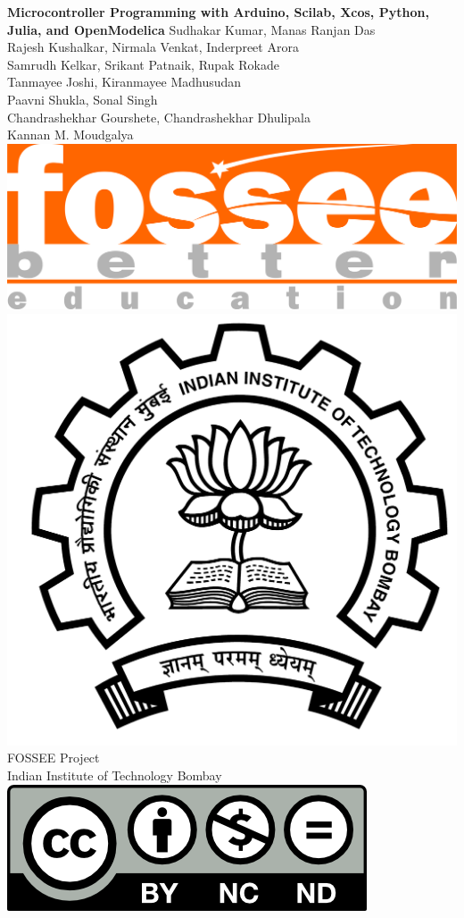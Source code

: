 \begin{center}
    {\bf {\Huge Microcontroller Programming with Arduino, Scilab, Xcos,
            Python, Julia, and OpenModelica}}
    \vfill
    Sudhakar Kumar, Manas Ranjan Das \\
    Rajesh Kushalkar, Nirmala Venkat, Inderpreet Arora \\
    Samrudh Kelkar, Srikant Patnaik, Rupak Rokade \\
    Tanmayee Joshi, Kiranmayee Madhusudan \\ 
    Paavni Shukla, Sonal Singh \\
    Chandrashekhar Gourshete, Chandrashekhar Dhulipala \\
    Kannan M. Moudgalya \\
    \vfill
    \includegraphics[width=0.3\linewidth]{suppl/fossee_logo_hi.png} \quad
    \includegraphics[width=0.2\linewidth]{suppl/IITB-logo-HighRes.png} \\
    FOSSEE Project \\
    Indian Institute of Technology Bombay \\ [2mm]
    \includegraphics[width=0.15\linewidth]{suppl/by-nc-nd.png}
\end{center}

\clearpage
